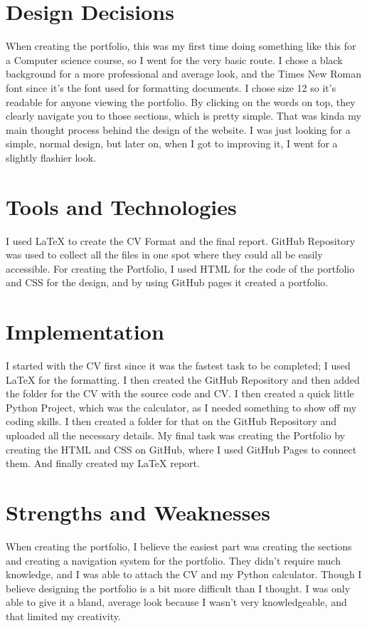 \documentclass[12pt,a4paper]{article}
\begin{document}
\section{Design Decisions}
When creating the portfolio, this was my first time doing something like this for a Computer science course, so
I went for the very basic route. I chose a black background for a more professional and average look, and the Times New Roman font since it's the font used for formatting documents. I chose size 12 so it's readable for anyone viewing the portfolio. By clicking on the words on top, they clearly navigate you to those sections, which is pretty simple. That was kinda my main thought process behind the design of the website. I was just looking for a simple, normal design, but later on, when I got to improving it, I went for a slightly flashier look.

\section{Tools and Technologies}
I used LaTeX to create the CV Format and the final report. GitHub Repository was used to collect all the files in one spot where they could all be easily accessible. For creating the Portfolio, I used HTML for the code of the portfolio and CSS for the design, and by using GitHub pages it created a portfolio.

\section{Implementation}
I started with the CV first since it was the fastest task to be completed; I used LaTeX for the formatting. I then
created the GitHub Repository and then added the folder for the CV with the source code and CV. I then created
a quick little Python Project, which was the calculator, as I needed something to show off my coding skills. I then created a folder for that on the GitHub Repository and uploaded all the necessary details. My final task was creating the Portfolio by creating the HTML and CSS on GitHub, where I used GitHub Pages to connect them. And finally created my LaTeX report.

\section{Strengths and Weaknesses}
When creating the portfolio, I believe the easiest part was creating the sections and creating a navigation system for the portfolio. They didn't require much knowledge, and I was able to attach the CV and my Python calculator. Though I believe designing the portfolio is a bit more difficult than I thought. I was only able to give it a bland, average look because I wasn't very knowledgeable, and that limited my creativity.
\end{document}
